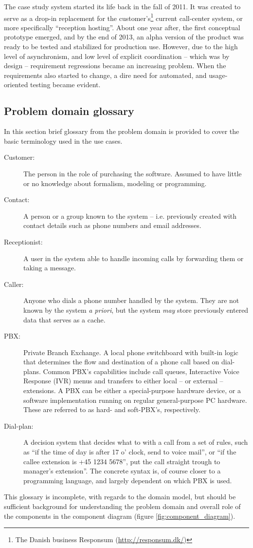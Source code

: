 \noindent The case study system started its life back in the fall of 2011. It was created to serve as a drop-in replacement for the customer's\footnote{The Danish business Responsum (\url{http://responsum.dk/})} current call-center system, or more specifically ``reception hosting''. About one year after, the first conceptual prototype emerged, and by the end of 2013, an alpha version of the product was ready to be tested and stabilized for production use. However, due to the high level of asynchronism, and low level of explicit coordination -- which was by design -- requirement regressions became an increasing problem. When the requirements also started to change, a dire need for automated, and usage-oriented testing became evident.

\subsection{Problem domain glossary}
In this section brief glossary from the problem domain is provided to cover the basic terminology used in the use cases.
\begin{description}
  \item[Customer:] The person in the role of purchasing the software. Assumed to have little or no knowledge about formalism, modeling or programming.
  \item[Contact:] A person or a group known to the system -- i.e. previously created with contact details such as phone numbers and email addresses.
  \item[Receptionist:] A user in the system able to handle incoming calls by forwarding them or taking a message.
  \item[Caller:] Anyone who dials a phone number handled by the system. They are not known by the system \textit{a priori}, but the system \textit{may} store previously entered data that serves as a cache.
  \item[PBX:] Private Branch Exchange. A local phone switchboard with built-in logic that determines the flow and destination of a phone call based on dial-plans. Common PBX's capabilities include call queues, Interactive Voice Response (IVR) menus and transfers to either local -- or external -- extensions. A PBX can be either a special-purpose hardware device, or a software implementation running on regular general-purpose PC hardware. These are referred to as hard- and soft-PBX's, respectively.
  \item[Dial-plan:] A decision system that decides what to with a call from a set of rules, such as ``if the time of day is after 17 o' clock, send to voice mail'', or ``if the callee extension is +45 1234 5678'', put the call straight trough to manager's extension''. The concrete syntax is, of course closer to a programming language, and largely dependent on which PBX is used.

\end{description}
This glossary is incomplete, with regards to the domain model, but should be sufficient background for understanding the problem domain and overall role of the components in the component diagram (figure \ref{fig:component_diagram}).

